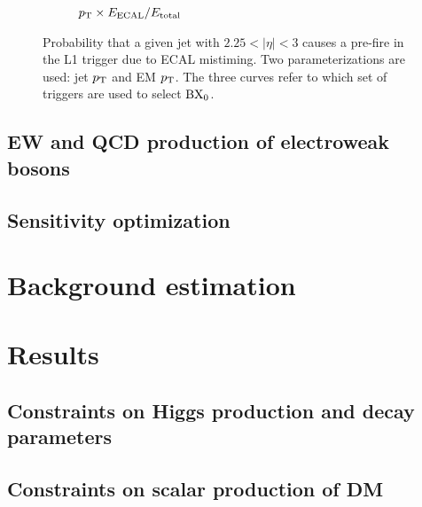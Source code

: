 \begin{figure}[]
\begin{center}
\begin{subfigure}[t]{0.49\textwidth}
            \caption{$p_\mathrm{T} \times E_\mathrm{ECAL}/E_\mathrm{total}$}
            \label{fig:vbf:hltb}
        \end{subfigure}
        \caption{Probability that a given jet with $2.25<|\eta|<3$ causes a pre-fire in the L1 trigger due to ECAL mistiming.
                 Two parameterizations are used: jet $p_\mathrm{T}$ and EM $p_\mathrm{T}$.
                 The three curves refer to which set of triggers are used to select ${\mathrm{BX}_{0}}$.}
        \label{fig:vbf:pre_eff1}
    \end{center}
\end{figure}




\subsection{EW and QCD production of electroweak bosons}

\subsection{Sensitivity optimization}

\section{Background estimation}

\section{Results}

\subsection{Constraints on Higgs production and decay parameters}

\subsection{Constraints on scalar production of DM}

